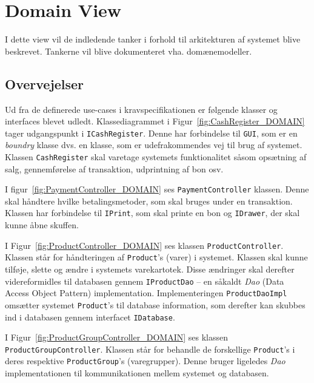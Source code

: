 \section{Domain View}
I dette view vil de indledende tanker i forhold til arkitekturen af systemet blive beskrevet. Tankerne vil blive dokumenteret vha. domænemodeller.

\subsection{Overvejelser}
Ud fra de definerede use-cases i kravspecifikationen er følgende klasser og interfaces blevet udledt. Klassediagrammet i Figur~\ref{fig:CashRegister_DOMAIN} tager udgangspunkt i \texttt{ICashRegister}. Denne har forbindelse til \texttt{GUI}, som er en \textit{boundry} klasse dvs. en klasse, som er udefrakommendes vej til brug af systemet. Klassen \texttt{CashRegister} skal varetage systemets funktionalitet såsom opsætning af salg, gennemførelse af transaktion, udprintning af bon osv.


I figur~\ref{fig:PaymentController_DOMAIN} ses \texttt{PaymentController} klassen. Denne skal håndtere hvilke betalingsmetoder, som skal bruges under en transaktion. Klassen har forbindelse til \texttt{IPrint}, som skal printe en bon og \texttt{IDrawer}, der skal kunne åbne skuffen.

I Figur~\ref{fig:ProductController_DOMAIN} ses klassen \texttt{ProductController}. Klassen står for håndteringen af \texttt{Product}'s (varer) i systemet. Klassen skal kunne tilføje, slette og ændre i systemets varekartotek. Disse ændringer skal derefter videreformidles til databasen gennem \texttt{IProductDao} -- en såkaldt \textit{Dao} (Data Access Object Pattern) implementation. Implementeringen \texttt{ProductDaoImpl} omsætter systemet \texttt{Product}'s til database information, som derefter kan skubbes ind i databasen gennem interfacet \texttt{IDatabase}.


I Figur~\ref{fig:ProductGroupController_DOMAIN} ses klassen \texttt{ProductGroupController}. Klassen står for behandle de forskellige \texttt{Product}'s i deres respektive \texttt{ProductGroup}'s (varegrupper). Denne bruger ligeledes \textit{Dao} implementationen til kommunikationen mellem systemet og databasen.

